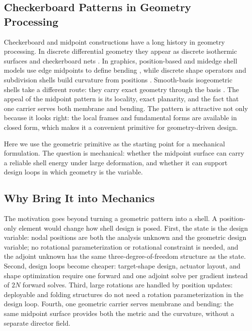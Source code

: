 \subsection{Checkerboard Patterns in Geometry Processing}
\label{sec:intro-graphics}

Checkerboard and midpoint constructions have a long history in geometry processing. In discrete differential
geometry they appear as discrete isothermic surfaces and checkerboard nets
\cite{bobenkoPinkall1996,dellinger2024}. In graphics, position-based and
midedge shell models use edge midpoints to define bending
\cite{chenEtAl2018,chenEtAl2026}, while discrete shape operators and
subdivision shells build curvature from positions
\cite{grinspunEtAl2003,grinspunEtAl2006,cirakEtAl2000}. Smooth-basis
isogeometric shells take a different route: they carry exact geometry through
the basis \cite{hughesEtAl2005,kiendlEtAl2009}. The appeal of the midpoint
pattern is its locality, exact planarity, and the fact that one carrier serves
both membrane and bending. The pattern is attractive not only because it looks
right: the local frames and fundamental forms are available in closed form,
which makes it a convenient primitive for geometry-driven design.

Here we use the geometric primitive as the starting point for a mechanical formulation. The question
is mechanical: whether the midpoint surface can carry a reliable shell energy
under large deformation, and whether it can support design loops in which
geometry is the variable.

\subsection{Why Bring It into Mechanics}
\label{sec:intro-motivation}

The motivation goes beyond turning a geometric pattern into a shell. A position-only element would change how shell design is posed.
First, the state is the design variable: nodal positions are both the analysis
unknown and the geometric design variable; no rotational parameterization or
rotational constraint is needed, and the adjoint unknown has the same
three-degree-of-freedom structure as the state. Second, design loops become
cheaper: target-shape design, actuator layout, and shape optimization require
one forward and one adjoint solve per gradient instead of $2N$ forward solves.
Third, large rotations are handled by position updates: deployable and folding
structures do not need a rotation parameterization in the design loop. Fourth,
one geometric carrier serves membrane and bending: the same midpoint surface
provides both the metric and the curvature, without a separate director field.

